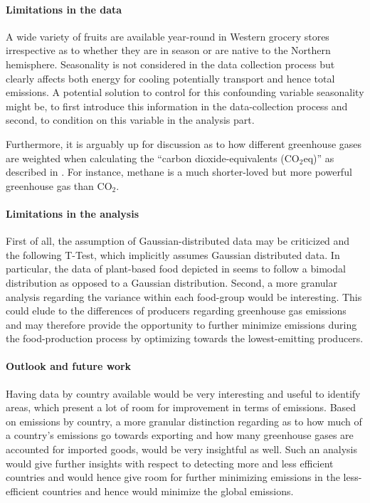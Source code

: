 \documentclass{article}
\begin{document}
\paragraph*{Limitations in the data}
A wide variety of fruits  are  available year-round in Western grocery stores  irrespective as to whether  they are in season or are native to the Northern hemisphere. 
Seasonality is not considered in the data collection process but clearly affects both energy for cooling potentially transport and hence total emissions.  
A potential solution to control for this confounding variable seasonality might be, to first introduce this information in the data-collection process and second, to condition on this variable in the analysis part.

Furthermore, it is arguably up for discussion as to how different greenhouse gases are weighted  when calculating the ``carbon dioxide-equivalents (CO$_{2}$eq)'' as described in  . For instance, methane is a much shorter-loved but more powerful greenhouse gas than CO$_{2}$.




\paragraph*{Limitations in the analysis}
First of all, the assumption of Gaussian-distributed data may be criticized and the following T-Test, which implicitly assumes Gaussian distributed data.
In particular, the data of plant-based food depicted in  seems to follow a bimodal distribution as opposed to a Gaussian distribution.
Second, a more granular analysis regarding the variance within each food-group would be interesting. This could elude to the differences of producers regarding greenhouse gas emissions and may therefore provide the opportunity to further minimize emissions during the food-production process by optimizing towards the lowest-emitting producers. 

\paragraph*{Outlook and future work}

Having data by country available would be  very interesting and useful to identify areas, which present a lot of room for improvement in terms of emissions. Based on emissions by country, a more granular distinction regarding  as to how much of a country's  emissions go towards exporting and how many greenhouse gases are accounted for  imported  goods, would be very insightful as well. Such an analysis would give further insights with respect to detecting more and less efficient countries and would hence give room for further minimizing emissions in the less-efficient countries and hence would minimize the global emissions.
\end{document}
